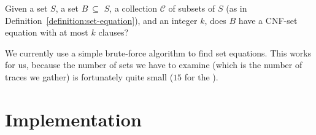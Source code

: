 \begin{definition}[\kcnfse]
Given a set $S$, a set $B~\subseteq$ $S$, a collection $\mathcal{C}$ of subsets
of $S$ (as in Definition~\ref{definition:set-equation}), and an integer $k$,
does $B$ have a CNF-set equation with at most $k$ clauses?
\end{definition}

We currently use a simple brute-force algorithm to find set equations. This
works for us, because the number of sets we have to examine (which is the
number of traces we gather) is fortunately quite small ($15$ for the \xserver).

\section{Implementation}
\label{chapter:dynamic:implementation}

